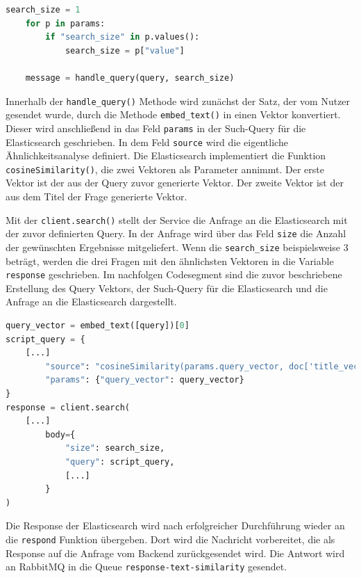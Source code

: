 \begin{lstlisting}[language=Python, caption={Auslesen der search\_{}size und Ausführen der KI}]
search_size = 1
    for p in params:
        if "search_size" in p.values():
            search_size = p["value"]

    message = handle_query(query, search_size)
\end{lstlisting}

Innerhalb der \texttt{handle\_{}query()} Methode wird zunächst der Satz, der vom Nutzer gesendet wurde, durch die Methode \texttt{embed\_{}text()} in einen Vektor konvertiert. Dieser  wird anschließend in das Feld \texttt{\glqq params\grqq{}} in der Such-Query für die Elasticsearch geschrieben. In dem Feld \texttt{\glqq source\grqq{}} wird die eigentliche Ähnlichkeitsanalyse definiert. Die Elasticsearch implementiert die Funktion \texttt{cosineSimilarity()}, die zwei Vektoren als Parameter annimmt. Der erste Vektor ist der  aus der Query zuvor generierte Vektor. Der zweite Vektor ist der aus dem Titel der Frage generierte Vektor. 

Mit der \texttt{client.search()} stellt der Service die Anfrage an die Elasticsearch mit der zuvor definierten Query. In der Anfrage wird über das Feld \texttt{\glqq size\grqq} die Anzahl der gewünschten Ergebnisse mitgeliefert. Wenn die \texttt{search\_{}size} beispielsweise 3 beträgt, werden die drei Fragen mit den ähnlichsten Vektoren in die Variable \texttt{response} geschrieben. Im nachfolgen Codesegment sind die zuvor beschriebene Erstellung des Query Vektors, der Such-Query für die Elasticsearch und die Anfrage an die Elasticsearch dargestellt.

\begin{lstlisting}[language=Python, caption={Ähnlichkeitssuche in der Elasticsearch}]
query_vector = embed_text([query])[0]
script_query = {
    [...]
        "source": "cosineSimilarity(params.query_vector, doc['title_vector']) + 1.0",
        "params": {"query_vector": query_vector}  
}
response = client.search(
    [...]
        body={
            "size": search_size,
            "query": script_query,
            [...]
        }
)
\end{lstlisting}

Die Response der Elasticsearch wird nach erfolgreicher Durchführung wieder an die \texttt{respond} Funktion übergeben. Dort wird die Nachricht vorbereitet, die als Response auf die Anfrage vom Backend zurückgesendet wird. Die Antwort wird an RabbitMQ in die Queue \texttt{response-text-similarity} gesendet.

